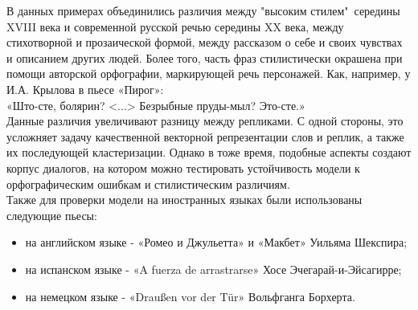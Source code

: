 \documentclass[a4paper,14pt]{article}
\begin{document}
\begin{justify}
\indent
В данных примерах объединились различия между "высоким стилем"\ середины XVIII века и современной русской речью середины XX века, между стихотворной и прозаической формой, между рассказом о себе и своих чувствах и описанием других людей. Более того, часть фраз стилистически окрашена при помощи авторской орфографии, маркирующей речь персонажей. Как, например, у И.А. Крылова в пьесе «Пирог»: \\
\indent
«Што-сте, болярин? <...> Безрыбные пруды-мыл? Это-сте.»\\
\indent
Данные различия увеличивают разницу между репликами. С одной стороны, это усложняет задачу качественной векторной репрезентации слов и реплик, а также их последующей кластеризации. Однако в тоже время, подобные аспекты создают корпус диалогов, на котором можно тестировать устойчивость модели к орфографическим ошибкам и стилистическим различиям.  \\
\indent
Также для проверки модели на иностранных языках были использованы следующие пьесы:
\begin{itemize}
  \item на английском языке - «Ромео и Джульетта» и «Макбет» Уильяма Шекспира;
  \item на испанском языке - «A fuerza de arrastrarse» Хосе Эчегарай­-и-­Эйсагирре;
  \item на немецком языке - «Draußen vor der Tür» Вольфганга Борхерта.
\end{itemize}
\end{justify}
\pagebreak
\end{document}
